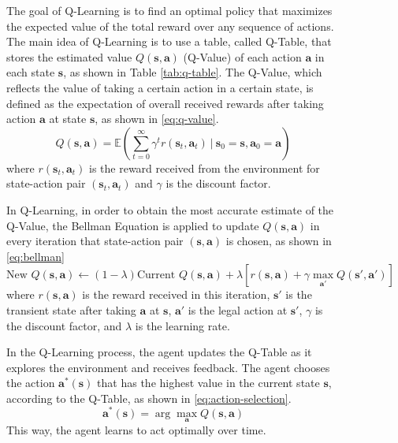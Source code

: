 \documentclass[10pt,a4paper]{article}
\begin{document}
\begin{figure}[H]
	The goal of Q-Learning is to find an optimal policy that maximizes the expected value of the total reward over any sequence of actions. The main idea of Q-Learning is to use a table, called Q-Table, that stores the estimated value $Q(\boldsymbol{s}, \boldsymbol{a})$ (Q-Value) of each action $\boldsymbol{a}$ in each state $\boldsymbol{s}$, as shown in Table \ref{tab:q-table}. The Q-Value, which reflects the value of taking a certain action in a certain state, is defined as the expectation of overall received rewards after taking action $\boldsymbol{a}$ at state $\boldsymbol{s}$, as shown in \eqref{eq:q-value}. 
	\begin{equation}
		Q(\boldsymbol{s}, \boldsymbol{a}) = \mathbb{E}\left(\sum_{t = 0}^{\infty} \gamma^{t}r(\boldsymbol{s}_{t}, \boldsymbol{a}_{t}) ~\left|~ \boldsymbol{s}_{0} = \boldsymbol{s}, \boldsymbol{a}_{0} = \boldsymbol{a}\right.\right)
		\label{eq:q-value}
	\end{equation}
	where $r(\boldsymbol{s}_{t}, \boldsymbol{a}_{t})$ is the reward received from the environment for state-action pair $(\boldsymbol{s}_{t}, \boldsymbol{a}_{t})$ and $\gamma$ is the discount factor. 
	
	In Q-Learning, in order to obtain the most accurate estimate of the Q-Value,  the Bellman Equation is applied to update $Q(\boldsymbol{s}, \boldsymbol{a})$ in every iteration that state-action pair $(\boldsymbol{s}, \boldsymbol{a})$ is chosen, as shown in \eqref{eq:bellman}
	\begin{equation}
		\text{New~} Q(\boldsymbol{s}, \boldsymbol{a}) \leftarrow (1-\lambda)\text{Current~} Q(\boldsymbol{s}, \boldsymbol{a}) + \lambda \left[ r(\boldsymbol{s}, \boldsymbol{a}) + \gamma \max_{\boldsymbol{a'}}Q(\boldsymbol{s'}, \boldsymbol{a'})\right]
		\label{eq:bellman}
	\end{equation}
	where $r(\boldsymbol{s}, \boldsymbol{a})$ is the reward received in this iteration, $\boldsymbol{s'}$ is the transient state after taking $\boldsymbol{a}$ at $\boldsymbol{s}$, $\boldsymbol{a'}$ is the legal action at $\boldsymbol{s'}$, $\gamma$ is the discount factor, and $\lambda$ is the learning rate. 
	
	In the Q-Learning process, the agent updates the Q-Table as it explores the environment and receives feedback. The agent chooses the action $\boldsymbol{a}^{*}(\boldsymbol{s})$ that has the highest value in the current state $\boldsymbol{s}$, according to the Q-Table, as shown in \eqref{eq:action-selection}.  
	\begin{equation}
		\boldsymbol{a}^{*}(\boldsymbol{s}) = \arg\max_{\boldsymbol{a}}Q(\boldsymbol{s}, \boldsymbol{a})
		\label{eq:action-selection}
	\end{equation}
	This way, the agent learns to act optimally over time.
	

\end{figure}
\end{document}
